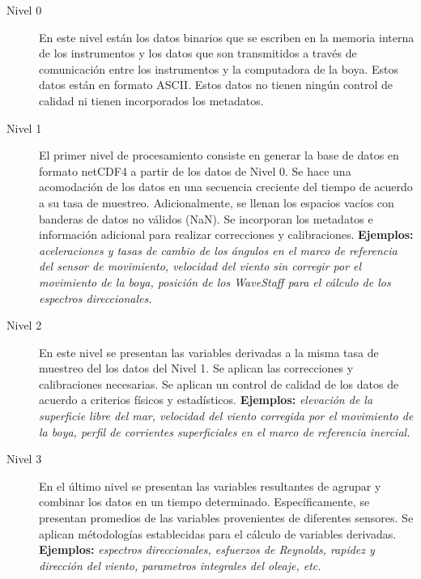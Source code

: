 \documentclass[11pt]{article}
\begin{document}
\begin{description}
  \item[Nivel 0] En este nivel están los datos binarios que se escriben en la
    memoria interna de los instrumentos y los datos que son transmitidos a
    través de comunicación entre los instrumentos y la computadora de la boya.
    Estos datos están en formato ASCII. Estos datos no tienen ningún control de
    calidad ni tienen incorporados los metadatos.

  \item[Nivel 1] El primer nivel de procesamiento consiste en generar la base de
    datos en formato netCDF4 a partir de los datos de Nivel 0. Se hace una
    acomodación de los datos en una secuencia creciente del tiempo de acuerdo a
    su tasa de muestreo. Adicionalmente, se llenan los espacios vacíos con
    banderas de datos no válidos (NaN). Se incorporan los metadatos e
    información adicional para realizar correcciones y calibraciones.
    \textbf{Ejemplos:} \emph{aceleraciones y tasas de cambio de los ángulos en el
    marco de referencia del sensor de movimiento, velocidad del viento sin
    corregir por el movimiento de la boya, posición de los WaveStaff para el
    cálculo de los espectros direccionales.}

  \item[Nivel 2] En este nivel se presentan las variables derivadas a la misma
    tasa de muestreo del los datos del Nivel 1. Se aplican las correcciones y
    calibraciones necesarias. Se aplican un control de calidad de los
    datos de acuerdo a criterios físicos y estadísticos.
    \textbf{Ejemplos:} \emph{elevación de la superficie libre del mar, velocidad
    del viento corregida por el movimiento de la boya, perfil de corrientes
    superficiales en el marco de referencia inercial.}

  \item[Nivel 3] En el último nivel se presentan las variables resultantes de
    agrupar y combinar los datos en un tiempo determinado. Específicamente, se
    presentan promedios de las variables provenientes de diferentes sensores. Se
    aplican métodologías establecidas para el cálculo de variables derivadas.
    \textbf{Ejemplos:} \emph{espectros direccionales, esfuerzos de Reynolds, rapidez y
    dirección del viento, parametros integrales del oleaje, etc.}

\end{description}


\end{document}
